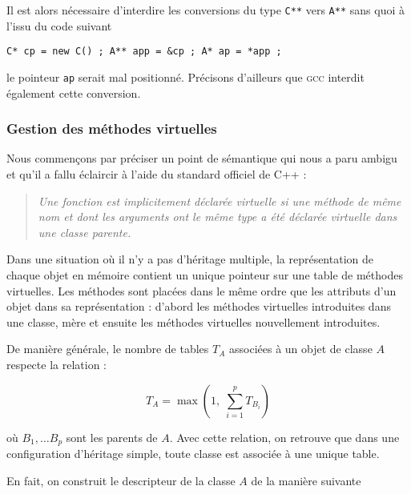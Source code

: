 \documentclass[11pt, a4paper]{article}
\newcommand{\prog}[1]{{\tt#1}}
\begin{document}
\medskip 

Il est alors nécessaire d'interdire les conversions du type \prog{C**} vers \prog{A**} sans quoi à l'issu du code suivant 
\begin{center} \prog{C* cp = new C() ; A** app = \&cp ; A* ap = *app ;}\end{center}

le pointeur \prog{ap} serait mal positionné. Précisons d'ailleurs que \textsc{gcc} interdit également cette conversion.


\subsubsection{Gestion des méthodes virtuelles}

Nous commençons par préciser un point de sémantique qui nous a paru ambigu et qu'il a fallu éclaircir à l'aide du standard officiel de C++ : 

\begin{quote}
\emph{Une fonction est implicitement déclarée virtuelle si une méthode de même nom et dont les arguments ont le même type a été déclarée virtuelle dans une classe parente.}
\end{quote}

Dans une situation où il n'y a pas d'héritage multiple, la représentation de chaque objet en mémoire contient un unique pointeur sur une table de méthodes virtuelles. Les méthodes sont placées dans le même ordre que les attributs d'un objet dans sa représentation : d'abord les méthodes virtuelles introduites dans une classe, mère et ensuite les méthodes virtuelles nouvellement introduites. \medskip

De manière générale, le nombre de tables $T_A$ associées à un objet de classe $A$ respecte la relation :

$$ T_A = \max \left( 1, \; \sum_{i=1}^{p} T_{B_i} \right) $$

où $B_1, \dots B_p$ sont les parents de $A$. 
Avec cette relation, on retrouve que dans une configuration d'héritage simple, toute classe est associée à une unique table. 

\medskip

En fait, on construit le descripteur de la classe $A$ de la manière suivante
\end{document}
